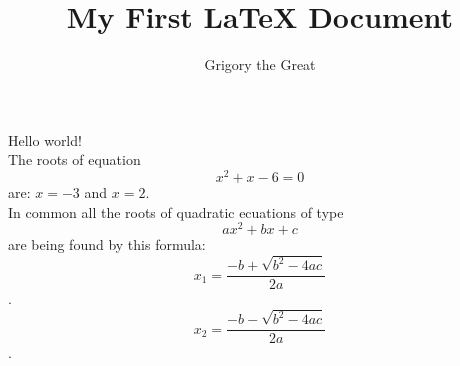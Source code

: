 \documentclass{article}
\begin{document}
\title{My First \LaTeX{} Document}
\author{Grigory the Great}
\maketitle
Hello world! \\
The roots of equation 
$$ x^2 + x - 6 = 0 $$
are:
$ x=-3$ and $x=2$. \\
In common all the roots of quadratic ecuations of type $$ax^2+bx+c$$ are being found by this formula:
$$x_1 = \frac{-b+\sqrt{b^2 -4ac}} {2a}$$.
$$x_2 = \frac{-b-\sqrt{b^2 -4ac}} {2a}$$.
\end{document}
